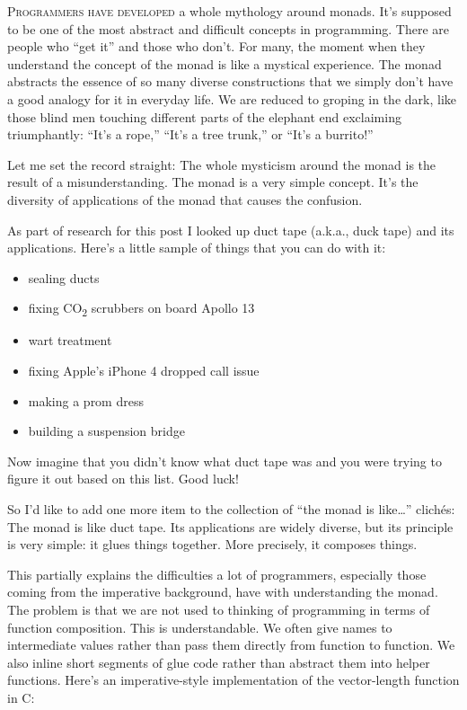 \lettrine[lhang=0.17]{P}{rogrammers have developed} a whole mythology around monads. It's
supposed to be one of the most abstract and difficult concepts in
programming. There are people who ``get it'' and those who don't. For
many, the moment when they understand the concept of the monad is like a
mystical experience. The monad abstracts the essence of so many diverse
constructions that we simply don't have a good analogy for it in
everyday life. We are reduced to groping in the dark, like those blind
men touching different parts of the elephant end exclaiming
triumphantly: ``It's a rope,'' ``It's a tree trunk,'' or ``It's a
burrito!''

Let me set the record straight: The whole mysticism around the monad is
the result of a misunderstanding. The monad is a very simple concept.
It's the diversity of applications of the monad that causes the
confusion.

As part of research for this post I looked up duct tape (a.k.a., duck
tape) and its applications. Here's a little sample of things that you
can do with it:

\begin{itemize}
\tightlist
\item
  sealing ducts
\item
  fixing CO\textsubscript{2} scrubbers on board Apollo 13
\item
  wart treatment
\item
  fixing Apple's iPhone 4 dropped call issue
\item
  making a prom dress
\item
  building a suspension bridge
\end{itemize}

\noindent
Now imagine that you didn't know what duct tape was and you were trying
to figure it out based on this list. Good luck!

So I'd like to add one more item to the collection of ``the monad is
like\ldots{}'' clichés: The monad is like duct tape. Its applications
are widely diverse, but its principle is very simple: it glues things
together. More precisely, it composes things.

This partially explains the difficulties a lot of programmers,
especially those coming from the imperative background, have with
understanding the monad. The problem is that we are not used to thinking
of programming in terms of function composition. This is understandable.
We often give names to intermediate values rather than pass them
directly from function to function. We also inline short segments of
glue code rather than abstract them into helper functions. Here's an
imperative-style implementation of the vector-length function in C:

